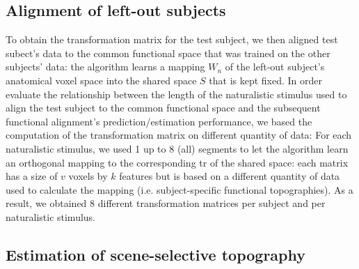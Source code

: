 \subsection{Alignment of left-out subjects}






%
To obtain the transformation matrix for the test subject, we then aligned
test subect's data to the common functional space that was trained on the
other subjects' data:
%
the algorithm learns a mapping $W_{n}$ of the left-out subject's anatomical
voxel space into the shared space $S$ that is kept fixed.
%
In order evaluate the relationship between the length of the naturalistic
stimulus used to align the test subject to the common functional space and the
subsequent functional alignment's prediction/estimation performance, we based
the computation of the transformation matrix on different quantity of data:
%
For each naturalistic stimulus, we used 1 up to 8 (all) segments to let the
algorithm learn an orthogonal mapping to the corresponding \acs{tr} of the
shared space:
%
each matrix has a size of $v$ voxels by $k$ features but is based on a different
quantity of data used to calculate the mapping (i.e. subject-specific functional
topographies).
%
As a result, we obtained 8 different transformation matrices per subject and per
naturalistic stimulus.


\subsection{Estimation of scene-selective topography}




